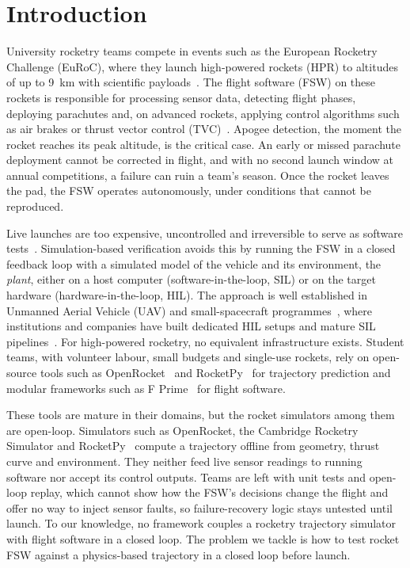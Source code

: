 \section{Introduction}\label{s:intro}
University rocketry teams compete in events such as the European Rocketry Challenge (EuRoC), where they launch high-powered rockets (HPR) to altitudes of up to 9~km with scientific payloads~\cite{rocketpy-ref}. The flight software (FSW) on these rockets is responsible for processing sensor data, detecting flight phases, deploying parachutes and, on advanced rockets, applying control algorithms such as air brakes or thrust vector control (TVC)~\cite{rocketpy-ref, clary2024georgia-tech-avionics}. Apogee detection, the moment the rocket reaches its peak altitude, is the critical case. An early or missed parachute deployment cannot be corrected in flight, and with no second launch window at annual competitions, a failure can ruin a team's season. Once the rocket leaves the pad, the FSW operates autonomously, under conditions that cannot be reproduced.

Live launches are too expensive, uncontrolled and irreversible to serve as software tests~\cite{coopmans-sil-hil-verification-uav, kiesbye2019-moveII-cubsat}. Simulation-based verification avoids this by running the FSW in a closed feedback loop with a simulated model of the vehicle and its environment, the \emph{plant}, either on a host computer (software-in-the-loop, SIL) or on the target hardware (hardware-in-the-loop, HIL). The approach is well established in Unmanned Aerial Vehicle (UAV) and small-spacecraft programmes~\cite{santos-hil-uav-autopilot, bittar-guidance-sil-uav-xplane-simulink, kiesbye2019-moveII-cubsat}, where institutions and companies have built dedicated HIL setups and mature SIL pipelines~\cite{ulbig2019flightsimulatorbasedverification}. For high-powered rocketry, no equivalent infrastructure exists. Student teams, with volunteer labour, small budgets and single-use rockets, rely on open-source tools such as OpenRocket~\cite{niskanen2013openrocket} and RocketPy~\cite{rocketpy-ref} for trajectory prediction and modular frameworks such as F Prime~\cite{bocchino2018fprime} for flight software.

These tools are mature in their domains, but the rocket simulators among them are open-loop. Simulators such as OpenRocket, the Cambridge Rocketry Simulator and RocketPy~\cite{niskanen2013openrocket, eerland2017cambridgerocketry, rocketpy-ref} compute a trajectory offline from geometry, thrust curve and environment. They neither feed live sensor readings to running software nor accept its control outputs. Teams are left with unit tests and open-loop replay, which cannot show how the FSW's decisions change the flight and offer no way to inject sensor faults, so failure-recovery logic stays untested until launch. To our knowledge, no framework couples a rocketry trajectory simulator with flight software in a closed loop. The problem we tackle is how to test rocket FSW against a physics-based trajectory in a closed loop before launch.

